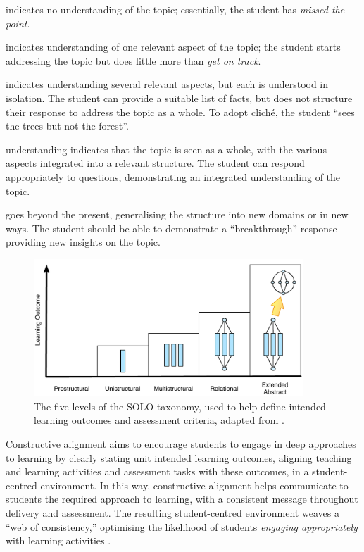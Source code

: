 \begin{description}
 	\item[Prestructural] indicates no understanding of the topic; essentially, the student has \emph{missed the point}.
 	\item[Unistructural] indicates understanding of one relevant aspect of the topic; the student starts addressing the topic but does little more than \emph{get on track}.
 	\item[Multistructural] indicates understanding several relevant aspects, but each is understood in isolation. The student can provide a suitable list of facts, but does not structure their response to address the topic as a whole. To adopt clich\'{e}, the student ``sees the trees but not the forest''.
 	\item[Relational] understanding indicates that the topic is seen as a whole, with the various aspects integrated into a relevant structure. The student can respond appropriately to questions, demonstrating an integrated understanding of the topic.
 	\item[Extended Abstract] goes beyond the present, generalising the structure into new domains or in new ways. The student should be able to demonstrate a ``breakthrough'' response providing new insights on the topic.
\end{description} 

\begin{figure}[htbp]
	\centering
	\includegraphics[width=0.9\textwidth]{SOLO}
	\caption{The five levels of the SOLO taxonomy, used to help define intended learning outcomes and assessment criteria, adapted from \citet{Biggs:2007}.}
	\label{fig:solo}
\end{figure}

Constructive alignment aims to encourage students to engage in deep approaches to learning by clearly stating unit intended learning outcomes, aligning teaching and learning activities and assessment tasks with these outcomes, in a student-centred environment. In this way, constructive alignment helps communicate to students the required approach to learning, with a consistent message throughout delivery and assessment. The resulting student-centred environment weaves a ``web of consistency,'' optimising the likelihood of students \emph{engaging appropriately} with learning activities \cite{Biggs:1999}.

